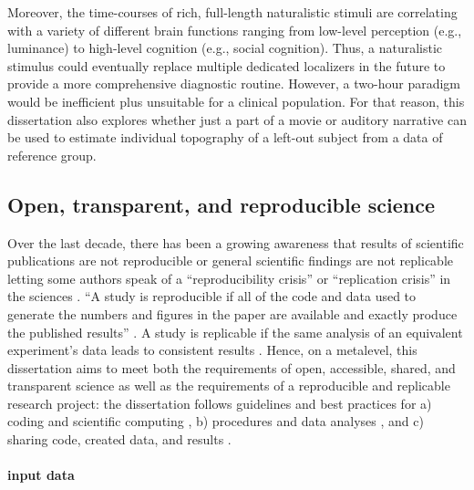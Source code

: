 
%
Moreover, the time-courses of rich, full-length naturalistic stimuli are
correlating with a variety of different brain functions ranging from low-level
perception (e.g., luminance) to high-level cognition (e.g., social cognition).
%
Thus, a naturalistic stimulus could eventually replace multiple dedicated
localizers in the future to provide a more comprehensive diagnostic routine.
%
However, a two-hour paradigm would be inefficient plus unsuitable for a clinical
population.
%
For that reason, this dissertation also explores whether just a part of a movie
or auditory narrative can be used to estimate individual topography of a
left-out subject from a data of reference group.


\subsection{Open, transparent, and reproducible science}

Over the last decade, there has been a growing awareness that results of
scientific publications are not reproducible or general scientific findings are
not replicable letting some authors speak of a ``reproducibility crisis'' or
``replication crisis'' in the sciences \citep{baker2016reproducibility,
plesser2018reproducibility, stupple2019reproducibility, nosek2022replicability}.
``A study is reproducible if all of the code and data used to generate the
numbers and figures in the paper are available and exactly produce the published
results'' \citep{leek2017most}.
A study is replicable if the same analysis of an equivalent experiment's data
leads to consistent results \citep{dubois2016building, leek2017most}.
%
Hence, on a metalevel, this dissertation aims to meet both the requirements of
open, accessible, shared, and transparent science \citep{watson2015will,
fecher2014open} as well as the requirements of a reproducible and replicable
research project:
%
the dissertation follows guidelines and best practices for a) coding and
scientific computing \citep{wilson2014best}, b) procedures and data analyses
\citep{nichols2017best, poldrack2017scanning, poldrack2019establishment}, and c)
sharing code, created data, and results \citep{eglen2017toward, nichols2017best,
pernet2015improving}.


\paragraph{input data}

